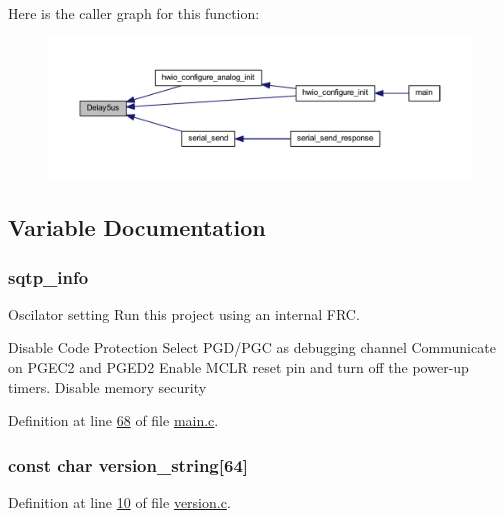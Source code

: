 Here is the caller graph for this function\+:\nopagebreak
\begin{figure}[H]
\begin{center}
\leavevmode
\includegraphics[width=350pt]{d0/dc0/a00033_a3b0017f6ec0e04a6435bba00fe325294_icgraph}
\end{center}
\end{figure}




\subsection{Variable Documentation}
\hypertarget{a00033_a4e1e8b365cce7a6d497671681eb5823c}{
\subsubsection[{sqtp\+\_\+info}]{ sqtp\+\_\+info}}\label{a00033_a4e1e8b365cce7a6d497671681eb5823c}


Oscilator setting Run this project using an internal F\+R\+C. 

Disable Code Protection Select P\+G\+D/\+P\+G\+C as debugging channel Communicate on P\+G\+E\+C2 and P\+G\+E\+D2 Enable M\+C\+L\+R reset pin and turn off the power-\/up timers. Disable memory security 

Definition at line \hyperlink{a00048_source_l00068}{68} of file \hyperlink{a00048_source}{main.\+c}.

\hypertarget{a00033_a9913e6dccd88bd052d3e8e9d73da4ede}{
\subsubsection[{version\+\_\+string}]{\setlength{\rightskip}{0pt plus 5cm}const char version\+\_\+string\mbox{[}64\mbox{]}}}\label{a00033_a9913e6dccd88bd052d3e8e9d73da4ede}


Definition at line \hyperlink{a00075_source_l00010}{10} of file \hyperlink{a00075_source}{version.\+c}.

